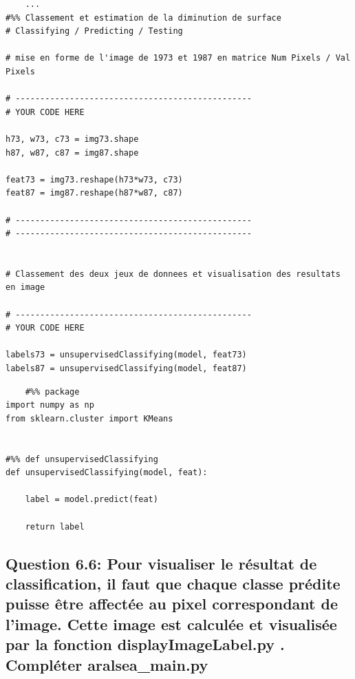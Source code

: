 \begin{lstlisting}
    ...
#%% Classement et estimation de la diminution de surface
# Classifying / Predicting / Testing

# mise en forme de l'image de 1973 et 1987 en matrice Num Pixels / Val Pixels

# ------------------------------------------------
# YOUR CODE HERE

h73, w73, c73 = img73.shape 
h87, w87, c87 = img87.shape

feat73 = img73.reshape(h73*w73, c73)
feat87 = img87.reshape(h87*w87, c87)

# ------------------------------------------------
# ------------------------------------------------


# Classement des deux jeux de donnees et visualisation des resultats en image

# ------------------------------------------------
# YOUR CODE HERE

labels73 = unsupervisedClassifying(model, feat73)
labels87 = unsupervisedClassifying(model, feat87)
\end{lstlisting}

\begin{lstlisting}
    #%% package
import numpy as np
from sklearn.cluster import KMeans


#%% def unsupervisedClassifying
def unsupervisedClassifying(model, feat):

    label = model.predict(feat)

    return label
\end{lstlisting}

\subsection*{Question 6.6: Pour visualiser le résultat de classification, il faut que chaque classe prédite puisse être affectée au pixel correspondant de l’image. Cette image est calculée et visualisée par la fonction displayImageLabel.py . Compléter aralsea\_main.py}